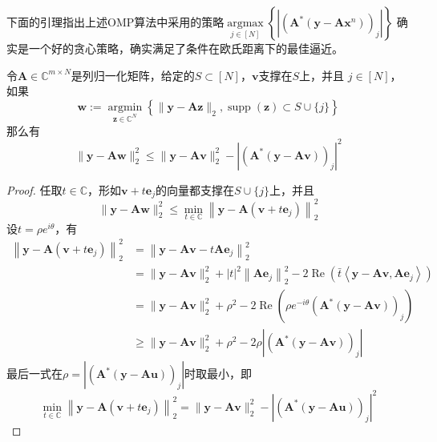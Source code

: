 下面的引理指出上述OMP算法中采用的策略$\underset{j \in[N]}{\operatorname{argmax}}\left\{\left|\left(\mathbf{A}^*\left(\mathbf{y}-\mathbf{A} \mathbf{x}^n\right)\right)_j\right|\right\}$
确实是一个好的贪心策略，确实满足了条件在欧氏距离下的最佳逼近。
\begin{lemma}
    令$\mathbf{A} \in \mathbb{C}^{m \times N}$是列归一化矩阵，给定的$S \subset[N]$，$\mathbf{v}$支撑在$S$上，并且
    $j \in[N]$，如果
    \begin{equation}
        \mathbf{w}:=\underset{\mathbf{z} \in \mathbb{C}^N}{\operatorname{argmin}}\left\{\|\mathbf{y}-\mathbf{A z}\|_2,\operatorname{supp}(\mathbf{z}) \subset S \cup\{j\}\right\}
    \end{equation}
    那么有
    \begin{equation}
        \|\mathbf{y}-\mathbf{A} \mathbf{w}\|_2^2 \leq\|\mathbf{y}-\mathbf{A v}\|_2^2-\left|\left(\mathbf{A}^*(\mathbf{y}-\mathbf{A} \mathbf{v})\right)_j\right|^2
    \end{equation}
\end{lemma}
\begin{proof}
任取$t \in \mathbb{C}$，形如$\mathbf{v}+t \mathbf{e}_j$的向量都支撑在$S \cup\{j\}$上，并且
\begin{equation}
    \|\mathbf{y}-\mathbf{A} \mathbf{w}\|_2^2 \leq \min _{t \in \mathbb{C}}\left\|\mathbf{y}-\mathbf{A}\left(\mathbf{v}+t \mathbf{e}_j\right)\right\|_2^2
\end{equation}
设$t=\rho e^{i \theta}$，有
\begin{equation}
    \begin{aligned}
    \left\|\mathbf{y}-\mathbf{A}\left(\mathbf{v}+t \mathbf{e}_j\right)\right\|_2^2 & =\left\|\mathbf{y}-\mathbf{A v}-t \mathbf{A} \mathbf{e}_j\right\|_2^2 \\
    & =\|\mathbf{y}-\mathbf{A v}\|_2^2+|t|^2\left\|\mathbf{A} \mathbf{e}_j\right\|_2^2-2 \operatorname{Re}\left(\bar{t}\left\langle\mathbf{y}-\mathbf{A v},\mathbf{A} \mathbf{e}_j\right\rangle\right) \\
    & =\|\mathbf{y}-\mathbf{A v}\|_2^2+\rho^2-2 \operatorname{Re}\left(\rho e^{-i \theta}\left(\mathbf{A}^*(\mathbf{y}-\mathbf{A v})\right)_j\right) \\
    & \geq\|\mathbf{y}-\mathbf{A v}\|_2^2+\rho^2-2 \rho\left|\left(\mathbf{A}^*(\mathbf{y}-\mathbf{A} \mathbf{v})\right)_j\right|
    \end{aligned}
\end{equation}
最后一式在$\rho=\left|\left(\mathbf{A}^*(\mathbf{y}-\mathbf{A} \mathbf{u})\right)_j\right|$时取最小，即
\begin{equation}
    \min _{t \in \mathbb{C}}\left\|\mathbf{y}-\mathbf{A}\left(\mathbf{v}+t \mathbf{e}_j\right)\right\|_2^2=\|\mathbf{y}-\mathbf{A v}\|_2^2-\left|\left(\mathbf{A}^*(\mathbf{y}-\mathbf{A} \mathbf{u})\right)_j\right|^2
\end{equation}
\end{proof}
